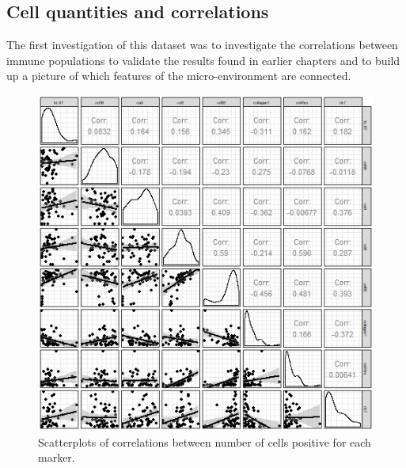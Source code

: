 \subsection{Cell quantities and correlations}

The first investigation of this dataset was to investigate the correlations between immune populations to validate the results found in earlier chapters and to build up a picture of which features of the micro-environment are connected.

\begin{figure}
    \centering
    \includegraphics{Chapter4/figs/Britroc_cell_correlation2.png}
    \caption{Scatterplots of correlations between number of cells positive for each marker.}
    \label{fig:britroc_corr_scatt}
\end{figure}

